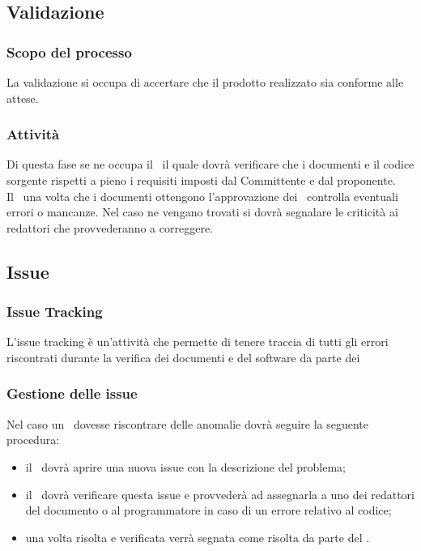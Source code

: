 \documentclass[../NormeDiProgetto.tex]{subfiles}
\begin{document}
		\subsection{Validazione}
		\subsubsection{Scopo del processo}
		La validazione si occupa di accertare che il prodotto realizzato sia conforme alle attese.\\
		\subsubsection{Attività}
		Di questa fase se ne occupa il \responsabilediprogetto\ il quale dovrà verificare che i documenti e il codice sorgente rispetti a pieno i requisiti imposti dal Committente e dal proponente.\\Il \responsabilediprogetto\ una volta che i documenti ottengono l'approvazione dei \verificatori\ controlla eventuali errori o mancanze.
		Nel caso ne vengano trovati si dovrà segnalare le criticità ai redattori che provvederanno a correggere.
		
		
		
		\subsection{Issue}
		\subsubsection{Issue Tracking}
		L'issue tracking è un'attività che permette di tenere traccia di tutti gli errori riscontrati durante la verifica dei documenti e del software da parte dei \verificatori\.\\
		\subsubsection{Gestione delle issue}
		Nel caso un \verificatore\ dovesse riscontrare delle anomalie dovrà seguire la seguente procedura:
		\begin{itemize}
			\item il \verificatore\ dovrà aprire una nuova issue con la descrizione del problema;
			\item il \responsabilediprogetto\ dovrà verificare questa issue e provvederà ad assegnarla a uno dei redattori del documento o al programmatore in caso di un errore relativo al codice;
			\item una volta risolta e verificata verrà segnata come risolta da parte del \responsabilediprogetto .
		\end{itemize}
\end{document}
